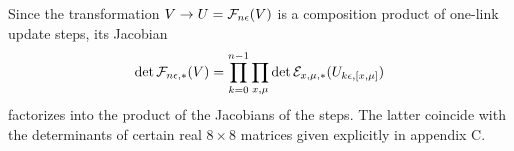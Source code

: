 Since the transformation $V\to U=\mathcal{F}_{n\epsilon}(V)$
is a composition product of one-link update steps,
its Jacobian
\begin{equation}
  \det\mathcal{F}_{n\epsilon,*}(V)=
  \prod_{k=0}^{n-1}
  \prod_{x,\mu}\det\mathcal{E}_{x,\mu,*}(U_{k\epsilon,[x,\mu]})
\end{equation}
factorizes into the product of the Jacobians of the steps.
The latter coincide with the determinants of certain real
$8\times8$ matrices given explicitly
in appendix C.
